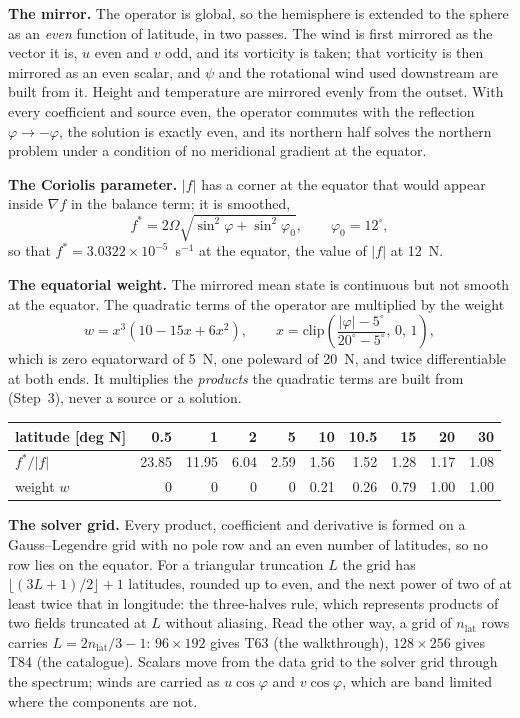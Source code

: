 \documentclass[11pt,a4paper]{article}
\newcommand{\grad}{\nabla}
\begin{document}
\textbf{The mirror.} The operator is global, so the hemisphere is extended to
the sphere as an \emph{even} function of latitude, in two passes. The wind is
first mirrored as the vector it is, $u$ even and $v$ odd, and its vorticity is
taken; that vorticity is then mirrored as an even scalar, and $\psi$ and the
rotational wind used downstream are built from it. Height and temperature are
mirrored evenly from the outset. With every coefficient and source even, the
operator commutes with the reflection $\varphi\to-\varphi$, the solution is
exactly even, and its northern half solves the northern problem under a
condition of no meridional gradient at the equator.

\textbf{The Coriolis parameter.} $|f|$ has a corner at the equator that would
appear inside $\grad f$ in the balance term; it is smoothed,
\begin{equation}
f^{*} = 2\Omega\sqrt{\sin^2\varphi + \sin^2\varphi_0},
\qquad \varphi_0 = 12^\circ ,
\label{eq:fstar}
\end{equation}
so that $f^{*}=3.0322\times10^{-5}$~s$^{-1}$ at the equator, the value of
$|f|$ at 12~N.

\textbf{The equatorial weight.} The mirrored mean state is continuous but not
smooth at the equator. The quadratic terms of the operator are multiplied by
the weight
\begin{equation}
w = x^3\left(10 - 15x + 6x^2\right),
\qquad
x = \mathrm{clip}\!\left(\frac{|\varphi|-5^\circ}{20^\circ-5^\circ},\,0,\,1\right),
\label{eq:weight}
\end{equation}
which is zero equatorward of 5~N, one poleward of 20~N, and twice
differentiable at both ends. It multiplies the \emph{products} the quadratic
terms are built from (Step~3), never a source or a solution.
\begin{center}
\small
\begin{tabular}{lrrrrrrrrr}
\toprule
latitude [deg N] & 0.5 & 1 & 2 & 5 & 10 & 10.5 & 15 & 20 & 30 \\
\midrule
$f^{*}/|f|$ & 23.85 & 11.95 & 6.04 & 2.59 & 1.56 & 1.52 & 1.28 & 1.17 & 1.08 \\
weight $w$ & 0 & 0 & 0 & 0 & 0.21 & 0.26 & 0.79 & 1.00 & 1.00 \\
\bottomrule
\end{tabular}
\end{center}

\textbf{The solver grid.} Every product, coefficient and derivative is formed
on a Gauss--Legendre grid with no pole row and an even number of latitudes, so
no row lies on the equator. For a triangular truncation $L$ the grid has
$\lfloor(3L+1)/2\rfloor+1$ latitudes, rounded up to even, and the next power of
two of at least twice that in longitude: the three-halves rule, which
represents products of two fields truncated at $L$ without aliasing. Read the
other way, a grid of $n_{\text{lat}}$ rows carries $L=2n_{\text{lat}}/3-1$:
$96\times192$ gives T63 (the walkthrough), $128\times256$ gives T84 (the
catalogue). Scalars move from the data grid to the solver grid through the
spectrum; winds are carried as $u\cos\varphi$ and $v\cos\varphi$, which are
band limited where the components are not.
\end{document}
